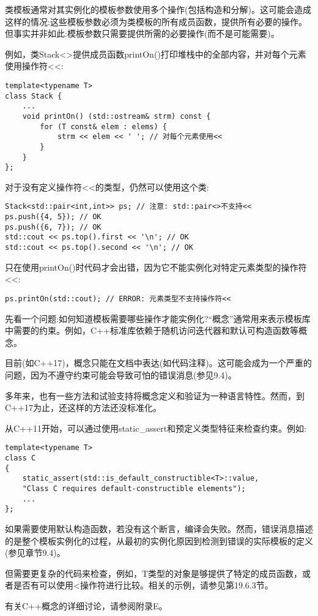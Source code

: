 
类模板通常对其实例化的模板参数使用多个操作(包括构造和分解)。这可能会造成这样的情况:这些模板参数必须为类模板的所有成员函数，提供所有必要的操作。但事实并非如此:模板参数只需要提供所需的必要操作(而不是可能需要)。

例如，类Stack<>提供成员函数printOn()打印堆栈中的全部内容，并对每个元素使用操作符<<:

\begin{lstlisting}[style=styleCXX]
template<typename T>
class Stack {
	...
	void printOn() (std::ostream& strm) const {
		for (T const& elem : elems) {
			strm << elem << ' '; // 对每个元素使用<<
		}
	}
};
\end{lstlisting}

对于没有定义操作符<<的类型，仍然可以使用这个类:

\begin{lstlisting}[style=styleCXX]
Stack<std::pair<int,int>> ps; // 注意: std::pair<>不支持<<
ps.push({4, 5}); // OK
ps.push({6, 7}); // OK
std::cout << ps.top().first << '\n'; // OK
std::cout << ps.top().second << '\n'; // OK
\end{lstlisting}

只在使用printOn()时代码才会出错，因为它不能实例化对特定元素类型的操作符<<:

\begin{lstlisting}[style=styleCXX]
ps.printOn(std::cout); // ERROR: 元素类型不支持操作符<<
\end{lstlisting}


先看一个问题:如何知道模板需要哪些操作才能实例化?“概念”通常用来表示模板库中需要的约束。例如，C++标准库依赖于随机访问迭代器和默认可构造函数等概念。

目前(如C++17)，概念只能在文档中表达(如代码注释)。这可能会成为一个严重的问题，因为不遵守约束可能会导致可怕的错误消息(参见9.4)。

多年来，也有一些方法和试验支持将概念定义和验证为一种语言特性。然而，到C++17为止，还这样的方法还没标准化。

从C++11开始，可以通过使用static\_assert和预定义类型特征来检查约束。例如:

\begin{lstlisting}[style=styleCXX]
template<typename T>
class C
{
	static_assert(std::is_default_constructible<T>::value,
	"Class C requires default-constructible elements");
	...
};
\end{lstlisting}

如果需要使用默认构造函数，若没有这个断言，编译会失败。然而，错误消息描述的是整个模板实例化的过程，从最初的实例化原因到检测到错误的实际模板的定义(参见章节9.4)。

但需要更复杂的代码来检查，例如，T类型的对象是够提供了特定的成员函数，或者是否有可以使用<操作符进行比较。相关的示例，请参见第19.6.3节。

有关C++概念的详细讨论，请参阅附录E。















